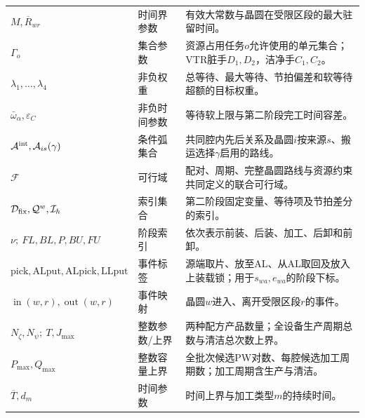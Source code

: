 \documentclass[final,5p,times,twocolumn]{elsarticle}
\begin{document}
\begin{table}[t]
\begin{tabular}{C{0.20\textwidth}C{0.16\textwidth}C{0.43\textwidth}}
$M,\overline R_{wr}$ & 时间界参数 & 有效大常数与晶圆在受限区段的最大驻留时间。\\
$\Gamma_o$ & 集合参数 & 资源占用任务$o$允许使用的单元集合；VTR脏手$D_1,D_2$，洁净手$C_1,C_2$。\\
$\lambda_1,\ldots,\lambda_4$ & 非负权重 & 总等待、最大等待、节拍偏差和软等待超额的目标权重。\\
$\bar\omega_\alpha,\varepsilon_C$ & 非负时间参数 & 等待软上限与第二阶段完工时间容差。\\
$\mathcal A^{\rm int},\mathcal A_{is}(\gamma)$ & 条件弧集合 & 共同腔内先后关系及晶圆$i$按来源$s$、搬运选择$\gamma$启用的路线。\\
$\mathcal F$ & 可行域 & 配对、周期、完整晶圆路线与资源约束共同定义的联合可行域。\\
$\mathcal D_{\rm fix},\mathcal Q^w,\mathcal I_h$ & 索引集合 & 第二阶段固定变量、等待项及节拍差分的索引。\\
$\nu;\ FL,BL,P,BU,FU$ & 阶段索引 & 依次表示前装、后装、加工、后卸和前卸。\\
$\mathrm{pick,ALput,ALpick,LLput}$ & 事件标签 & 源端取片、放至AL、从AL取回及放入上装载锁；用于$s_{wa},e_{wa}$的阶段下标。\\
$\operatorname{in}(w,r),\operatorname{out}(w,r)$ & 事件映射 & 晶圆$w$进入、离开受限区段$r$的事件。\\
$N_{\zeta},N_{\psi};\ T,J_{\max}$ & 整数参数/上界 & 两种配方产品数量；全设备生产周期总数与清洁总次数上界。\\
$P_{\max},Q_{\max}$ & 整数容量上界 & 全批次候选PW对数、每腔候选加工周期数；加工周期含生产与清洁。\\
$\overline T,d_m$ & 时间参数 & 时间上界与加工类型$m$的持续时间。\\
\bottomrule
\end{tabular}
\end{table}
\end{document}
